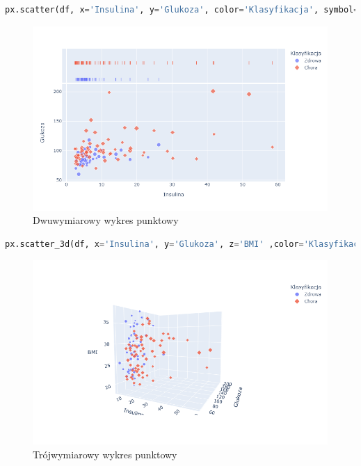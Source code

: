 \documentclass[a4paper,12pt,oneside]{book}
\begin{document}
\begin{lstlisting}[language=Python, caption=Tworzenie wykresu punktowego 2D]
px.scatter(df, x='Insulina', y='Glukoza', color='Klasyfikacja', symbol='Klasyfikacja', marginal_x="rug", size='Wiek', size_max=8, height = 500, width = 800)
\end{lstlisting}

\begin{figure}[H]
\centering
\includegraphics[scale=0.4]{2dNOCODE.png}
\caption{Dwuwymiarowy wykres punktowy }
\end{figure}

\begin{lstlisting}[language=Python, caption=Tworzenie wykresu punktowego 3D]
px.scatter_3d(df, x='Insulina', y='Glukoza', z='BMI' ,color='Klasyfikacja', symbol='Klasyfikacja', size='Wiek', size_max=12, opacity=0.8,  height = 500, width = 800)
\end{lstlisting}

\begin{figure}[H]
\centering
\includegraphics[scale=0.4]{3dNOCODE.png}
\caption{Trójwymiarowy wykres punktowy}
\end{figure}
\end{document}
